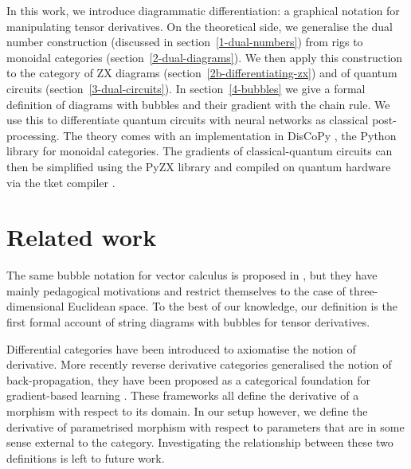 In this work, we introduce diagrammatic differentiation: a graphical notation
for manipulating tensor derivatives. On the theoretical side, we generalise
the dual number construction (discussed in section~\ref{1-dual-numbers})
from rigs to monoidal categories (section~\ref{2-dual-diagrams}). We then apply
this construction to the category of ZX diagrams (section~\ref{2b-differentiating-zx})
and of quantum circuits (section~\ref{3-dual-circuits}). In section~\ref{4-bubbles}
we give a formal definition of diagrams with bubbles and their gradient with the
chain rule. We use this to differentiate quantum circuits with neural
networks as classical post-processing. The theory comes with an
implementation in DisCoPy \cite{DeFeliceEtAl20}, the Python library for
monoidal categories. The gradients of classical-quantum circuits can then
be simplified using the PyZX library \cite{KissingerVanDeWetering19} and compiled
on quantum hardware via the tket compiler \cite{SivarajahEtAl20}.

\section*{Related work}

The same bubble notation for vector calculus is proposed in \cite{KimEtAl20},
but they have mainly pedagogical motivations and restrict themselves to the case
of three-dimensional Euclidean space. To the best of our knowledge, our
definition is the first formal account of string diagrams with bubbles for
tensor derivatives.

Differential categories \cite{BluteEtAl06} have been introduced to axiomatise
the notion of derivative. More recently reverse derivative categories
\cite{CockettEtAl19} generalised the notion of back-propagation, they have been
proposed as a categorical foundation for gradient-based learning
\cite{CruttwellEtAl21}. These frameworks all define the derivative
of a morphism with respect to its domain. In our setup however, we define
the derivative of parametrised morphism with respect to parameters that are
in some sense external to the category. Investigating the relationship between
these two definitions is left to future work.
